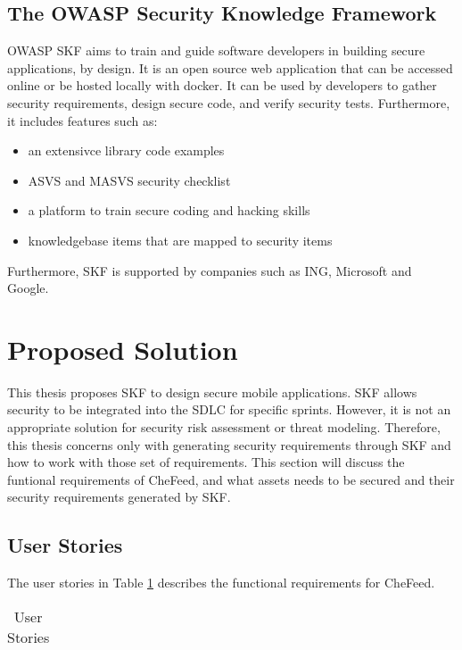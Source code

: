 \subsection{The OWASP Security Knowledge Framework}
OWASP SKF aims to train and guide software developers in building secure applications, by design. It is an open source web application that can be accessed online or be hosted locally with docker. It can be used by developers to gather security requirements, design secure code, and verify security tests. Furthermore, it includes features such as:
\begin{itemize}
    \item an extensivce library code examples
    \item ASVS and MASVS security checklist
    \item a platform to train secure coding and hacking skills
    \item knowledgebase items that are mapped to security items
\end{itemize}
Furthermore, SKF is supported by companies such as ING, Microsoft and Google.

\section{Proposed Solution}
This thesis proposes SKF to design secure mobile applications. SKF allows security to be integrated into the SDLC for specific sprints. However, it is not an appropriate solution for security risk assessment or threat modeling. Therefore, this thesis concerns only with generating security requirements through SKF and how to work with those set of requirements. This section will discuss the funtional requirements of CheFeed, and what assets needs to be secured and their security requirements generated by SKF.

\subsection{User Stories}
The user stories in Table \ref{} describes the functional requirements for CheFeed.

\begin{table}
    \centering
    \caption{User Stories}
    \label{}
    \begin{tabulary}{1.0\textwidth}{|L|L|}
        \hline
          
        \hline
    \end{tabulary}
\end{table}


